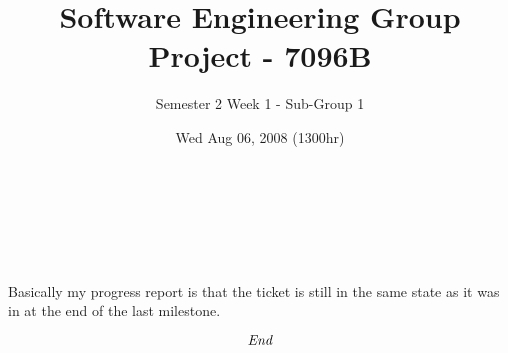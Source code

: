 \documentclass[10pt, a4]{article}
\begin{document}
 
\title{Software Engineering Group Project - 7096B}
\author{Semester 2 Week 1 - Sub-Group 1}
\date{Wed Aug 06, 2008 (1300hr)}
 
\maketitle 
 

\\
\paragraph{}
\\
\paragraph{}
Basically my progress report is that the ticket is still in the same state as it was in at the end of the last milestone.

\[\emph{End}\]
\end{document}
